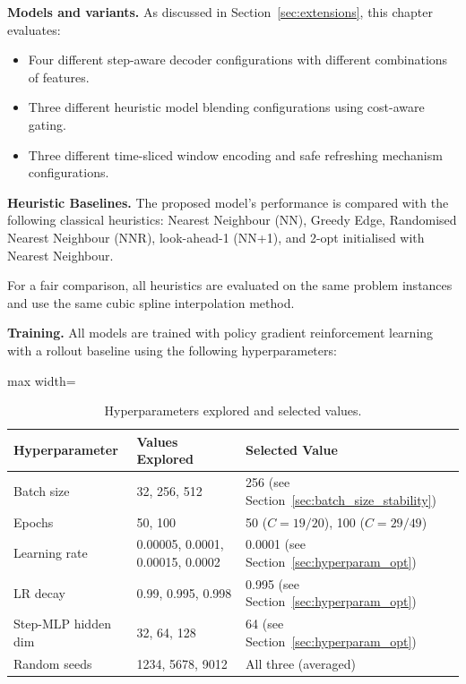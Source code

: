 \textbf{Models and variants.} As discussed in Section~\ref{sec:extensions}, this chapter evaluates:

\begin{itemize}
    \item Four different step-aware decoder configurations with different combinations of
    features.
    \item Three different heuristic model blending configurations using cost-aware gating.
    \item Three different time-sliced window encoding and safe refreshing mechanism
    configurations.
\end{itemize}

\textbf{Heuristic Baselines.} The proposed model's performance is compared with the following classical heuristics:
Nearest Neighbour (NN), Greedy Edge, Randomised Nearest Neighbour (NNR),
look-ahead-1 (NN+1), and 2-opt initialised with Nearest Neighbour.

For a fair comparison, all heuristics are evaluated on the same problem instances and use the
same cubic spline interpolation method.

\textbf{Training.} All models are trained with policy gradient reinforcement learning with a rollout baseline
using the following hyperparameters:

\begin{table}[H]
\centering
\caption{Hyperparameters explored and selected values.}
\label{tab:hyperparams_explored}
\begin{adjustbox}{max width=\textwidth}
\begin{tabular}{lll}
\toprule
\textbf{Hyperparameter} & \textbf{Values Explored} & \textbf{Selected Value} \\
\midrule
Batch size          & 32, 256, 512                       & 256 (see Section~\ref{sec:batch_size_stability}) \\
Epochs              & 50, 100                            & 50 ($C = 19/20$), 100 ($C = 29/49$) \\
Learning rate       & 0.00005, 0.0001, 0.00015, 0.0002  & 0.0001 (see Section~\ref{sec:hyperparam_opt}) \\
LR decay            & 0.99, 0.995, 0.998                 & 0.995 (see Section~\ref{sec:hyperparam_opt}) \\
Step-MLP hidden dim & 32, 64, 128                        & 64 (see Section~\ref{sec:hyperparam_opt}) \\
Random seeds        & 1234, 5678, 9012                   & All three (averaged) \\
\bottomrule
\end{tabular}
\end{adjustbox}
\end{table}

